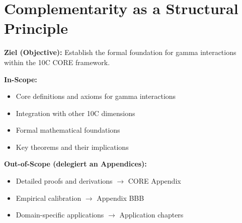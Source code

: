 %
%
%
%

\chapter{Complementarity as a Structural Principle}
\label{ch:complementarity}

\begin{tcolorbox}[
    colback=purple!5!white,
    colframe=purple!75!black,
    title={\textbf{Chapter Scope: Ziel / In-Scope / Out-of-Scope}},
    fonttitle=\bfseries
]

\textbf{Ziel (Objective):}
Establish the formal foundation for gamma interactions within the 10C CORE framework.

\vspace{0.3cm}
\textbf{In-Scope:}
\begin{itemize}[nosep]
    \item Core definitions and axioms for gamma interactions
    \item Integration with other 10C dimensions
    \item Formal mathematical foundations
    \item Key theorems and their implications
\end{itemize}

\vspace{0.3cm}
\textbf{Out-of-Scope (delegiert an Appendices):}
\begin{itemize}[nosep]
    \item Detailed proofs and derivations $\rightarrow$ CORE Appendix
    \item Empirical calibration $\rightarrow$ Appendix BBB
    \item Domain-specific applications $\rightarrow$ Application chapters
\end{itemize}

\end{tcolorbox}



